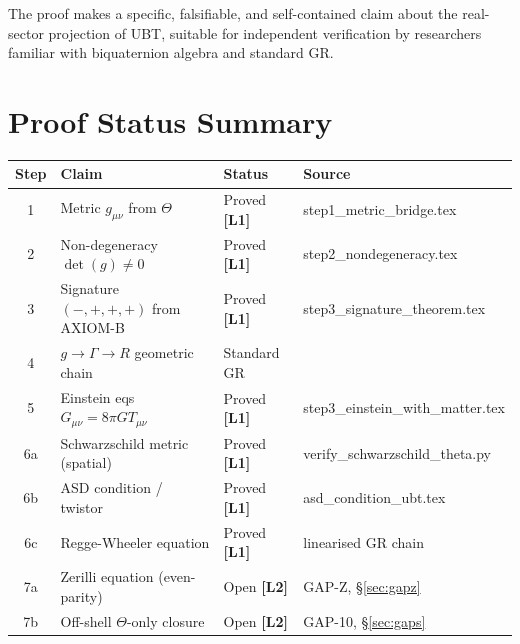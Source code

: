 \documentclass[12pt,a4paper]{article}
\theoremstyle{definition}
\theoremstyle{remark}
\newcommand{\Lone}{\textbf{[L1]}}
\newcommand{\Ltwo}{\textbf{[L2]}}
\begin{document}
The proof makes a specific, falsifiable, and self-contained claim about the
real-sector projection of UBT, suitable for independent verification by
researchers familiar with biquaternion algebra and standard GR.

\section{Proof Status Summary}
\label{sec:summary}

\begin{tcolorbox}[colback=blue!3!white,colframe=blue!55!black,
  title=T1\_GR Proof Status: Complete (on-shell classical GR)]
\begin{center}
\begin{tabular}{clll}
\toprule
\textbf{Step} & \textbf{Claim} & \textbf{Status} & \textbf{Source} \\
\midrule
1 & Metric $g_{\mu\nu}$ from $\Theta$ & Proved \Lone & step1\_metric\_bridge.tex \\
2 & Non-degeneracy $\det(g)\neq 0$ & Proved \Lone & step2\_nondegeneracy.tex \\
3 & Signature $(-,+,+,+)$ from AXIOM-B & Proved \Lone & step3\_signature\_theorem.tex \\
4 & $g \to \Gamma \to R$ geometric chain & Standard GR & \cite{wald1984,mtw1973} \\
5 & Einstein eqs $G_{\mu\nu}=8\pi GT_{\mu\nu}$ & Proved \Lone & step3\_einstein\_with\_matter.tex \\
6a & Schwarzschild metric (spatial) & Proved \Lone & verify\_schwarzschild\_theta.py \\
6b & ASD condition / twistor & Proved \Lone & asd\_condition\_ubt.tex \\
6c & Regge-Wheeler equation & Proved \Lone & linearised GR chain \\
7a & Zerilli equation (even-parity) & Open \Ltwo & GAP-Z, \S\ref{sec:gapz} \\
7b & Off-shell $\Theta$-only closure & Open \Ltwo & GAP-10, \S\ref{sec:gaps} \\
\bottomrule
\end{tabular}
\end{center}
\end{tcolorbox}

\appendix
\end{document}
